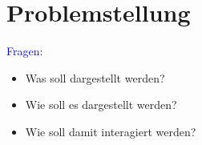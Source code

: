 \part{Problemstellung}
\label{part:golas}
\begin{frame}
\vspace{-1em}
\begin{center}
\end{center}
\textcolor{blue}{Fragen:}
\begin{itemize}
\item Was soll dargestellt werden?
\item Wie soll es dargestellt werden?
\item Wie soll damit interagiert werden?
\end{itemize}
\vspace{50px}
\end{frame}
